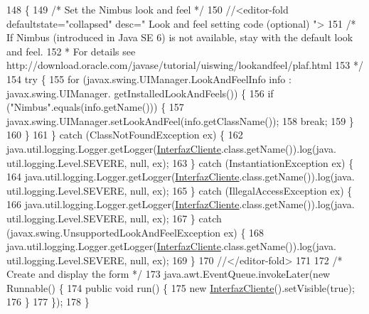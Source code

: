\begin{DoxyCode}
148                                            \{
149         \textcolor{comment}{/* Set the Nimbus look and feel */}
150         \textcolor{comment}{//<editor-fold defaultstate="collapsed" desc=" Look and feel setting code (optional) ">}
151         \textcolor{comment}{/* If Nimbus (introduced in Java SE 6) is not available, stay with the default look and feel.}
152 \textcolor{comment}{         * For details see http://download.oracle.com/javase/tutorial/uiswing/lookandfeel/plaf.html }
153 \textcolor{comment}{         */}
154         \textcolor{keywordflow}{try} \{
155             \textcolor{keywordflow}{for} (javax.swing.UIManager.LookAndFeelInfo info : javax.swing.UIManager.
      getInstalledLookAndFeels()) \{
156                 \textcolor{keywordflow}{if} (\textcolor{stringliteral}{"Nimbus"}.equals(info.getName())) \{
157                     javax.swing.UIManager.setLookAndFeel(info.getClassName());
158                     \textcolor{keywordflow}{break};
159                 \}
160             \}
161         \} \textcolor{keywordflow}{catch} (ClassNotFoundException ex) \{
162             java.util.logging.Logger.getLogger(\mbox{\hyperlink{class_interfaz_package_1_1_interfaz_cliente_a7e351585e987550c8e46079535f65537}{InterfazCliente}}.class.getName()).log(java.
      util.logging.Level.SEVERE, null, ex);
163         \} \textcolor{keywordflow}{catch} (InstantiationException ex) \{
164             java.util.logging.Logger.getLogger(\mbox{\hyperlink{class_interfaz_package_1_1_interfaz_cliente_a7e351585e987550c8e46079535f65537}{InterfazCliente}}.class.getName()).log(java.
      util.logging.Level.SEVERE, null, ex);
165         \} \textcolor{keywordflow}{catch} (IllegalAccessException ex) \{
166             java.util.logging.Logger.getLogger(\mbox{\hyperlink{class_interfaz_package_1_1_interfaz_cliente_a7e351585e987550c8e46079535f65537}{InterfazCliente}}.class.getName()).log(java.
      util.logging.Level.SEVERE, null, ex);
167         \} \textcolor{keywordflow}{catch} (javax.swing.UnsupportedLookAndFeelException ex) \{
168             java.util.logging.Logger.getLogger(\mbox{\hyperlink{class_interfaz_package_1_1_interfaz_cliente_a7e351585e987550c8e46079535f65537}{InterfazCliente}}.class.getName()).log(java.
      util.logging.Level.SEVERE, null, ex);
169         \}
170         \textcolor{comment}{//</editor-fold>}
171 
172         \textcolor{comment}{/* Create and display the form */}
173         java.awt.EventQueue.invokeLater(\textcolor{keyword}{new} Runnable() \{
174             \textcolor{keyword}{public} \textcolor{keywordtype}{void} run() \{
175                 \textcolor{keyword}{new} \mbox{\hyperlink{class_interfaz_package_1_1_interfaz_cliente_a7e351585e987550c8e46079535f65537}{InterfazCliente}}().setVisible(\textcolor{keyword}{true});
176             \}
177         \});
178     \}
\end{DoxyCode}


